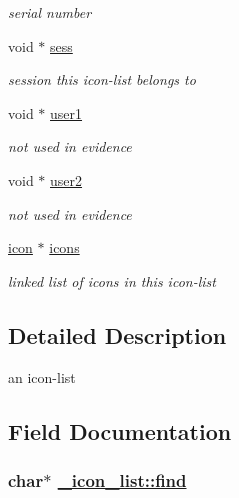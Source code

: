 \begin{CompactItemize}
\begin{CompactList}\small\item\em serial number \item\end{CompactList}\item 
\hypertarget{struct__icon__list_o42}{
void $\ast$ \hyperlink{struct__icon__list_o42}{sess}}
\label{struct__icon__list_o42}

\begin{CompactList}\small\item\em session this icon-list belongs to \item\end{CompactList}\item 
\hypertarget{struct__icon__list_o43}{
void $\ast$ \hyperlink{struct__icon__list_o43}{user1}}
\label{struct__icon__list_o43}

\begin{CompactList}\small\item\em not used in evidence \item\end{CompactList}\item 
\hypertarget{struct__icon__list_o44}{
void $\ast$ \hyperlink{struct__icon__list_o44}{user2}}
\label{struct__icon__list_o44}

\begin{CompactList}\small\item\em not used in evidence \item\end{CompactList}\item 
\hypertarget{struct__icon__list_o45}{
\hyperlink{struct__icon}{icon} $\ast$ \hyperlink{struct__icon__list_o45}{icons}}
\label{struct__icon__list_o45}

\begin{CompactList}\small\item\em linked list of icons in this icon-list \item\end{CompactList}\end{CompactItemize}


\subsection{Detailed Description}
an icon-list 



\subsection{Field Documentation}
\hypertarget{struct__icon__list_o37}{
\subsubsection[find]{\setlength{\rightskip}{0pt plus 5cm}char$\ast$ \hyperlink{struct__icon__list_o37}{\_\-icon\_\-list::find}}}
\label{struct__icon__list_o37}



